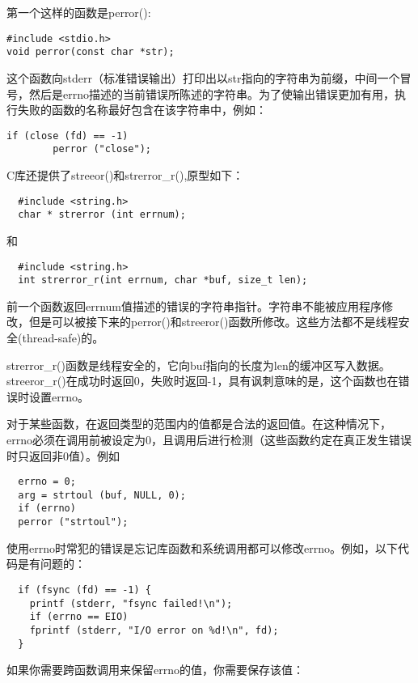 第一个这样的函数是perror():

\begin{lstlisting}
#include <stdio.h>
void perror(const char *str);
\end{lstlisting}

这个函数向stderr（标准错误输出）打印出以str指向的字符串为前缀，中间一个冒号，然后是errno描述的当前错误所陈述的字符串。为了使输出错误更加有用，执行失败的函数的名称最好包含在该字符串中，例如：

\begin{lstlisting}
if (close (fd) == -1)
        perror ("close");
\end{lstlisting}

C库还提供了streeor()和strerror\_r(),原型如下：

\begin{lstlisting}
  #include <string.h>
  char * strerror (int errnum);
\end{lstlisting}

和
\begin{lstlisting}
  #include <string.h>
  int strerror_r(int errnum, char *buf, size_t len);
\end{lstlisting}

前一个函数返回errnum值描述的错误的字符串指针。字符串不能被应用程序修改，但是可以被接下来的perror()和streeror()函数所修改。这些方法都不是线程安全(thread-safe)的。

strerror\_r()函数是线程安全的，它向buf指向的长度为len的缓冲区写入数据。streeror\_r()在成功时返回0，失败时返回-1，具有讽刺意味的是，这个函数也在错误时设置errno。

对于某些函数，在返回类型的范围内的值都是合法的返回值。在这种情况下，errno必须在调用前被设定为0，且调用后进行检测（这些函数约定在真正发生错误时只返回非0值）。例如

\begin{lstlisting}
  errno = 0;
  arg = strtoul (buf, NULL, 0);
  if (errno)
  perror ("strtoul");
\end{lstlisting}

使用errno时常犯的错误是忘记库函数和系统调用都可以修改errno。例如，以下代码是有问题的：

\begin{lstlisting}
  if (fsync (fd) == -1) {
    printf (stderr, "fsync failed!\n");
    if (errno == EIO)
    fprintf (stderr, "I/O error on %d!\n", fd);
  }
\end{lstlisting}

如果你需要跨函数调用来保留errno的值，你需要保存该值：

